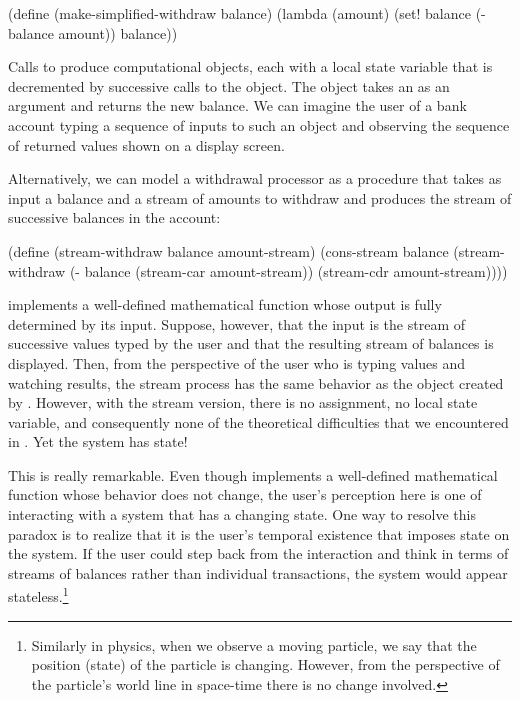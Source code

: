 \begin{codeBlock}
(define (make-simplified-withdraw balance)
  (lambda (amount)
    (set! balance (- balance amount))
    balance))
\end{codeBlock}

\noindent
Calls to  produce computational objects, each
with a local state variable  that is decremented by successive
calls to the object.  The object takes an  as an argument and
returns the new balance.  We can imagine the user of a bank account typing a
sequence of inputs to such an object and observing the sequence of returned
values shown on a display screen.

Alternatively, we can model a withdrawal processor as a procedure that takes as
input a balance and a stream of amounts to withdraw and produces the stream of
successive balances in the account:

\begin{codeBlock}
(define (stream-withdraw balance amount-stream)
  (cons-stream
   balance
   (stream-withdraw (- balance
                       (stream-car amount-stream))
                    (stream-cdr amount-stream))))
\end{codeBlock}

\noindent
{} implements a well-defined mathematical function whose
output is fully determined by its input.  Suppose, however, that the input
 is the stream of successive values typed by the user and
that the resulting stream of balances is displayed.  Then, from the perspective
of the user who is typing values and watching results, the stream process has
the same behavior as the object created by .
However, with the stream version, there is no assignment, no local state
variable, and consequently none of the theoretical difficulties that we
encountered in .  Yet the system has state!

This is really remarkable.  Even though  implements a
well-defined mathematical function whose behavior does not change, the user's
perception here is one of interacting with a system that has a changing state.
One way to resolve this paradox is to realize that it is the user's temporal
existence that imposes state on the system.  If the user could step back from
the interaction and think in terms of streams of balances rather than
individual transactions, the system would appear stateless.\footnote{Similarly
in physics, when we observe a moving particle, we say that the position (state)
of the particle is changing.  However, from the perspective of the particle's
world line in space-time there is no change involved.}

